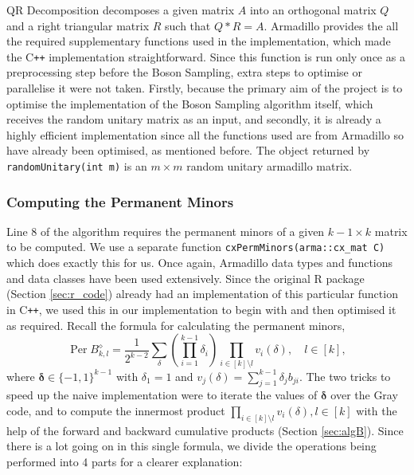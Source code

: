 \documentclass[11pt]{article}
\theoremstyle{theorem}
\theoremstyle{theorem}
\theoremstyle{remark}
\theoremstyle{note}
\theoremstyle{plain}
\theoremstyle{definition}
\DeclareMathOperator*{\Per}{\mathrm{Per}}
\begin{document}
QR Decomposition decomposes a given matrix $A$ into an orthogonal matrix $Q$ and a right triangular matrix $R$ such that $Q * R = A$. Armadillo provides the all the required supplementary functions used in the implementation, which made the C\texttt{++} implementation straightforward. Since this function is run only once as a preprocessing step before the Boson Sampling, extra steps to optimise or parallelise it were not taken. Firstly, because the primary aim of the project is to optimise the implementation of the Boson Sampling algorithm itself, which receives the random unitary matrix as an input, and secondly, it is already a highly efficient implementation since all the functions used are from Armadillo so have already been optimised, as mentioned before. The object returned by \texttt{randomUnitary(int m)} is an $m \times m$ random unitary armadillo matrix.
\subsubsection{Computing the Permanent Minors}
Line 8 of the algorithm requires the permanent minors of a given $k-1 \times k$ matrix to be computed. We use a separate function \texttt{cxPermMinors(arma::cx_mat C)} which does exactly this for us. Once again, Armadillo data types and functions and data classes have been used extensively. Since the original R package (Section \ref{sec:r_code}) already had an implementation of this particular function in C\texttt{++}, we used this in our implementation to begin with and then optimised it as required. Recall the formula for calculating the permanent minors,
\begin{equation}
\Per B_{k, l}^{\diamond} = \frac{1}{2^{k-2}} \sum_\delta \left( \prod_{i=1}^{k-1} \delta_i \right) \prod_{i \in [k] \setminus l} v_i (\delta), \quad l \in [k],
\end{equation}
where $\mathbf{\delta} \in \{-1, 1\}^{k-1}$ with $\delta_1 = 1$ and $v_j (\delta) = \sum_{j=1}^{k-1} \delta_j b_{ji}$. The two tricks to speed up the naive implementation were to iterate the values of $\mathbf{\delta}$ over the Gray code, and to compute the innermost product $\prod_{i \in [k] \setminus l} v_i (\delta), l \in [k]$ with the help of the forward and backward cumulative products (Section \ref{sec:algB}). Since there is a lot going on in this single formula, we divide the operations being performed into 4 parts for a clearer explanation:
\end{document}
